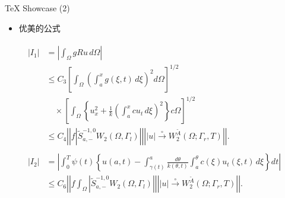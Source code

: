 \documentclass[dvipsnames, svgnames, mode=present, paper=screen, size=9pt,
style=husky]{powerdot}
\newcommand{\wt}{\widetilde}
\newcommand{\envert}[1]{\left\lvert#1\right\rvert}
\let\abs=\envert
\begin{document}
\begin{CJK*}{GBK}{song}
\begin{slide}{\TeX{} Showcase (2)}
  \begin{itemize}
  \item 优美的公式
  \end{itemize}
{
\begin{align}
\begin{split}\abs{I_1}
  &=\left\lvert \int_\Omega gRu\,d\Omega\right\rvert\\
&\le C_3\left[\int_\Omega\left(\int_{a}^x
  g(\xi,t)\,d\xi\right)^2d\Omega\right]^{1/2}\\
&\quad\times \left[\int_\Omega\left\{u^2_x+\frac{1}{k}
  \left(\int_{a}^x cu_t\,d\xi\right)^2\right\}
  c\Omega\right]^{1/2}\\
&\le C_4\left\lvert \left\lvert f\left\lvert \wt{S}^{-1,0}_{a,-}
  W_2(\Omega,\Gamma_l)\right\rvert\right\rvert
  \left\lvert \abs{u}\overset{\circ}\to W_2^{\wt{A}}
  (\Omega;\Gamma_r,T)\right\rvert\right\rvert.
\end{split}\label{eq:A}\\[10pt]
\begin{split}\abs{I_2}&=\left\lvert \int_{0}^T \psi(t)\left\{u(a,t)
  -\int_{\gamma(t)}^a\frac{d\theta}{k(\theta,t)}
  \int_{a}^\theta c(\xi)u_t(\xi,t)\,d\xi\right\}dt\right\rvert\\
&\le C_6\left\lvert \left\lvert f\int_\Omega
 \left\lvert \wt{S}^{-1,0}_{a,-}
  W_2(\Omega,\Gamma_l)\right\rvert\right\rvert
  \left\lvert \abs{u}\overset{\circ}\to W_2^{\wt{A}}
  (\Omega;\Gamma_r,T)\right\rvert\right\rvert.
\end{split}
\end{align}}  
\end{slide}


\end{CJK*}
\end{document}
